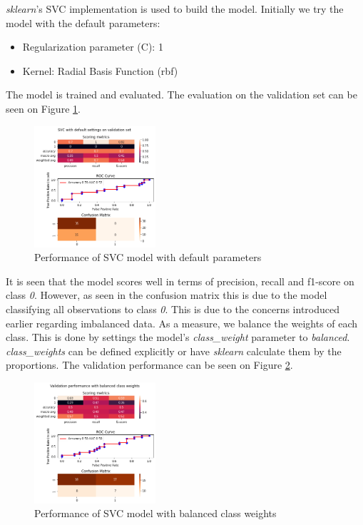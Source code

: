\textit{sklearn}'s SVC implementation is used to build the model. Initially we try the model with the default parameters: 
\begin{itemize}
  \item Regularization parameter (C): 1
  \item Kernel: Radial Basis Function (rbf)
\end{itemize}

\noindent The model is trained and evaluated. The evaluation on the validation set can be seen on Figure \ref{fig:results_default}.

\begin{figure}
  \centering
  \includegraphics[width=0.4\textwidth]{../project/images/results_default-svc.png}
  \caption{Performance of SVC model with default parameters}
  \label{fig:results_default}
\end{figure}
It is seen that the model scores well in terms of precision, recall and f1-score on class \textit{0}. However, as seen in the confusion matrix this is due to the model classifying all observations to class \textit{0}. This is due to the concerns introduced earlier regarding imbalanced data. As a measure, we balance the weights of each class. This is done by settings the model's \textit{class\_weight} parameter to \textit{balanced}. \textit{class\_weights} can be defined explicitly or have \textit{sklearn} calculate them by the proportions. The validation performance can be seen on Figure \ref{fig:results_default_balanced}.

\begin{figure}
  \centering
  \includegraphics[width=0.4\textwidth]{../project/images/results_default_balanced-svc.png}
  \caption{Performance of SVC model with balanced class weights}
  \label{fig:results_default_balanced}
\end{figure}

